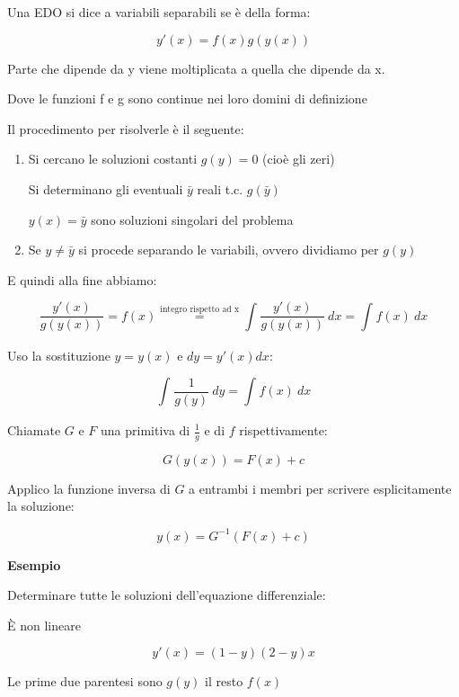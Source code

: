 \documentclass[11pt]{article}
\begin{document}
Una EDO si dice a variabili separabili se è della forma:

\[
    y'(x) = f(x) g(y(x))
\]

Parte che dipende da y viene moltiplicata a quella che dipende da x.

Dove le funzioni f e g sono continue nei loro domini di definizione

Il procedimento per risolverle è il seguente:

\begin{enumerate}
    \item Si cercano le soluzioni costanti $g(y)=0$ (cioè gli zeri)

        Si determinano gli eventuali $\bar y$ reali t.c. $g(\bar y)$

        $y(x)= \bar y$ sono soluzioni singolari del problema 
        
    \item Se $y \neq \bar y$ si procede separando le variabili, ovvero dividiamo per $g(y)$
\end{enumerate}

E quindi alla fine abbiamo:

\[
    \frac{y'(x)}{g(y(x))} = f(x) \overset{\text{integro rispetto ad x}}{=} \int_{{}}^{{}} {\frac{y'(x)}{g(y(x))} } \: d{x} {} = \int_{{}}^{{}} {f(x)} \: d{x} {}
\]

Uso la sostituzione $y = y(x)$ e $dy = y'(x) dx$:

\[
    \int_{{}}^{{}} {\frac{1}{g(y)} } \: d{y} = {\int_{{}}^{{}} {f(x)} \: d{x} {}}
\]

Chiamate $G$ e $F$ una primitiva di $\frac{1}{g} $ e di $f$ rispettivamente:

\[
    G(y(x)) = F(x) + c
\]

Applico la funzione inversa di $G$ a entrambi i membri per scrivere esplicitamente la soluzione:

\[
    y(x) = G ^{-1} (F(x) + c)
\]

\textbf{Esempio}

Determinare tutte le soluzioni dell'equazione differenziale:

È non lineare

\[
    y'(x) = (1-y)(2-y)x
\]

Le prime due parentesi sono $g(y)$ il resto $f(x)$
\end{document}

